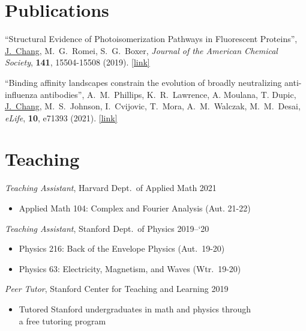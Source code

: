 \documentclass[margin,11pt]{res}
\newenvironment{myitemize}
{ \vspace{-1.5\topsep} \begin{itemize} \setlength\itemsep{0em}}
{ \end{itemize} \vspace{-0.5\topsep}}
\begin{document}
\begin{resume}
\section{Publications}

% 

\begin{changemargin}{0em}{3em}
    ``Structural Evidence of Photoisomerization Pathways in Fluorescent Proteins'',
    \underline{J.\ Chang}, M.\ G.\ Romei, S.\ G.\ Boxer,
    \textit{Journal of the American Chemical Society},
    \textbf{141},
    15504-15508
    (2019).
    \href{http://dx.doi.org/10.1021/jacs.9b08356}{[link]}
                 
                              
    ``Binding affinity landscapes constrain the evolution of broadly neutralizing anti-influenza antibodies'',
    A.\ M.\ Phillips, K.\ R.\ Lawrence, A. Moulana, T. Dupic, \underline{J.\ Chang}, M.\ S.\ Johnson, I.\ Cvijovic, T.\ Mora, A.\ M.\ Walczak, M.\ M.\ Desai,
    \textit{eLife},
    \textbf{10},
    e71393
    (2021).
    \href{https://doi.org/10.7554/eLife.71393}{[link]}
\end{changemargin}


\section{Teaching}

\textit{Teaching Assistant}, Harvard Dept.\ of Applied Math \hfill 2021\\
\begin{myitemize}
\item Applied Math 104: Complex and Fourier Analysis (Aut. 21-22)
\end{myitemize}

\textit{Teaching Assistant}, Stanford Dept.\ of Physics \hfill 2019--`20\\
\begin{myitemize}
    \item Physics 216: Back of the Envelope Physics (Aut.\ 19-20)
    \item Physics 63: Electricity, Magnetism, and Waves (Wtr.\ 19-20)
\end{myitemize}

\textit{Peer Tutor}, Stanford Center for Teaching and Learning \hfill 2019\\
\begin{myitemize}
    \item Tutored Stanford undergraduates in math and physics through\\
        a free tutoring program
\end{myitemize}


\end{resume}
\end{document}
